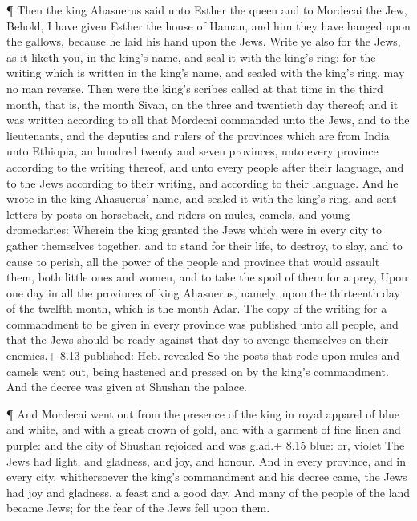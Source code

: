  ¶ Then the king Ahasuerus said unto Esther the queen and to
Mordecai the Jew, Behold, I have given Esther the house of Haman, and
him they have hanged upon the gallows, because he laid his hand upon the
Jews.  Write ye also for the Jews, as it liketh you, in the
king's name, and seal it with the king's ring: for the writing which is
written in the king's name, and sealed with the king's ring, may no man
reverse.  Then were the king's scribes called at that time
in the third month, that is, the month Sivan, on the three and twentieth
day thereof; and it was written according to all that Mordecai commanded
unto the Jews, and to the lieutenants, and the deputies and rulers of
the provinces which are from India unto Ethiopia, an hundred twenty and
seven provinces, unto every province according to the writing thereof,
and unto every people after their language, and to the Jews according to
their writing, and according to their language.  And he
wrote in the king Ahasuerus' name, and sealed it with the king's ring,
and sent letters by posts on horseback, and riders on mules, camels, and
young dromedaries:  Wherein the king granted the Jews which
were in every city to gather themselves together, and to stand for their
life, to destroy, to slay, and to cause to perish, all the power of the
people and province that would assault them, both little ones and women,
and to take the spoil of them for a prey,  Upon one day in
all the provinces of king Ahasuerus, namely, upon the thirteenth day of
the twelfth month, which is the month Adar.  The copy of
the writing for a commandment to be given in every province was
published unto all people, and that the Jews should be ready against
that day to avenge themselves on their enemies.+ 8.13 published: Heb.
revealed  So the posts that rode upon mules and camels went
out, being hastened and pressed on by the king's commandment. And the
decree was given at Shushan the palace.

 ¶ And Mordecai went out from the presence of the king in
royal apparel of blue and white, and with a great crown of gold, and
with a garment of fine linen and purple: and the city of Shushan
rejoiced and was glad.+ 8.15 blue: or, violet  The Jews had
light, and gladness, and joy, and honour.  And in every
province, and in every city, whithersoever the king's commandment and
his decree came, the Jews had joy and gladness, a feast and a good day.
And many of the people of the land became Jews; for the fear of the Jews
fell upon them.

